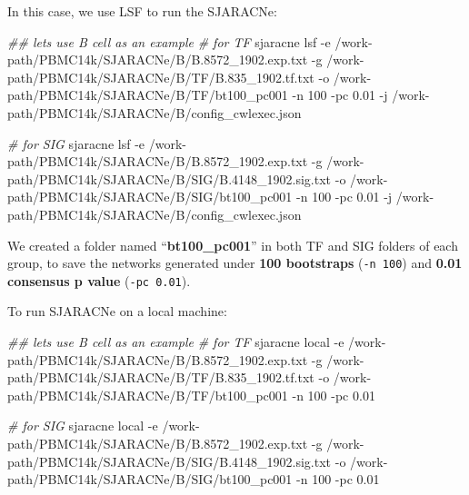 \documentclass[
  12pt,
]{book}
\newenvironment{Shaded}{\begin{snugshade}}{\end{snugshade}}
\newcommand{\AttributeTok}[1]{\textcolor[rgb]{0.13,0.29,0.53}{#1}}
\newcommand{\CommentTok}[1]{\textcolor[rgb]{0.56,0.35,0.01}{\textit{#1}}}
\newcommand{\ExtensionTok}[1]{#1}
\newcommand{\NormalTok}[1]{#1}
\begin{document}
In this case, we use LSF to run the SJARACNe:

\begin{Shaded}
\begin{Highlighting}[]
\CommentTok{\#\# let\textquotesingle{}s use B cell as an example}
\CommentTok{\# for TF}
\ExtensionTok{sjaracne}\NormalTok{ lsf }\AttributeTok{{-}e}\NormalTok{ /work{-}path/PBMC14k/SJARACNe/B/B.8572\_1902.exp.txt }\AttributeTok{{-}g}\NormalTok{ /work{-}path/PBMC14k/SJARACNe/B/TF/B.835\_1902.tf.txt }\AttributeTok{{-}o}\NormalTok{ /work{-}path/PBMC14k/SJARACNe/B/TF/bt100\_pc001 }\AttributeTok{{-}n}\NormalTok{ 100 }\AttributeTok{{-}pc}\NormalTok{ 0.01 }\AttributeTok{{-}j}\NormalTok{ /work{-}path/PBMC14k/SJARACNe/B/config\_cwlexec.json}

\CommentTok{\# for SIG}
\ExtensionTok{sjaracne}\NormalTok{ lsf }\AttributeTok{{-}e}\NormalTok{ /work{-}path/PBMC14k/SJARACNe/B/B.8572\_1902.exp.txt }\AttributeTok{{-}g}\NormalTok{ /work{-}path/PBMC14k/SJARACNe/B/SIG/B.4148\_1902.sig.txt }\AttributeTok{{-}o}\NormalTok{ /work{-}path/PBMC14k/SJARACNe/B/SIG/bt100\_pc001 }\AttributeTok{{-}n}\NormalTok{ 100 }\AttributeTok{{-}pc}\NormalTok{ 0.01 }\AttributeTok{{-}j}\NormalTok{ /work{-}path/PBMC14k/SJARACNe/B/config\_cwlexec.json}
\end{Highlighting}
\end{Shaded}

We created a folder named ``\textbf{bt100\_pc001}'' in both TF and SIG folders of each group, to save the networks generated under \textbf{100 bootstraps} (\texttt{-n\ 100}) and \textbf{0.01 consensus p value} (\texttt{-pc\ 0.01}).

To run SJARACNe on a local machine:

\begin{Shaded}
\begin{Highlighting}[]
\CommentTok{\#\# let\textquotesingle{}s use B cell as an example}
\CommentTok{\# for TF}
\ExtensionTok{sjaracne}\NormalTok{ local }\AttributeTok{{-}e}\NormalTok{ /work{-}path/PBMC14k/SJARACNe/B/B.8572\_1902.exp.txt }\AttributeTok{{-}g}\NormalTok{ /work{-}path/PBMC14k/SJARACNe/B/TF/B.835\_1902.tf.txt }\AttributeTok{{-}o}\NormalTok{ /work{-}path/PBMC14k/SJARACNe/B/TF/bt100\_pc001 }\AttributeTok{{-}n}\NormalTok{ 100 }\AttributeTok{{-}pc}\NormalTok{ 0.01}

\CommentTok{\# for SIG}
\ExtensionTok{sjaracne}\NormalTok{ local }\AttributeTok{{-}e}\NormalTok{ /work{-}path/PBMC14k/SJARACNe/B/B.8572\_1902.exp.txt }\AttributeTok{{-}g}\NormalTok{ /work{-}path/PBMC14k/SJARACNe/B/SIG/B.4148\_1902.sig.txt }\AttributeTok{{-}o}\NormalTok{ /work{-}path/PBMC14k/SJARACNe/B/SIG/bt100\_pc001 }\AttributeTok{{-}n}\NormalTok{ 100 }\AttributeTok{{-}pc}\NormalTok{ 0.01}
\end{Highlighting}
\end{Shaded}
\end{document}
